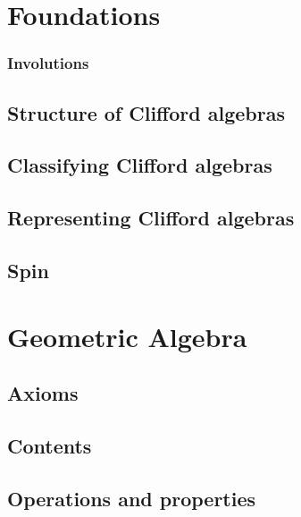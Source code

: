 \maketitle





\section{Foundations}
\label{cha:foundations}



\subsubsection{Involutions}

\subsection{Structure of Clifford algebras}

\subsection{Classifying Clifford algebras}

\subsection{Representing Clifford algebras}

\subsection{Spin}

\section{Geometric Algebra}

\subsection{Axioms}

\subsection{Contents}



\subsection{Operations and properties}


